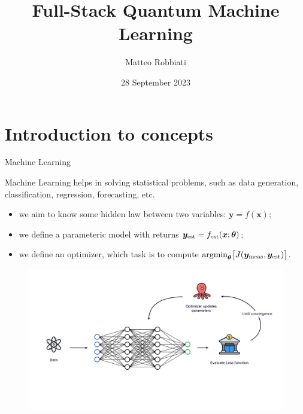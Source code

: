 \documentclass[8pt, xcolor={svgnames}, hyperref={linkcolor=black}]{beamer}
\title{Full-Stack Quantum Machine Learning}
\date{28 September 2023}
\author{Matteo Robbiati}
\begin{document}
\begin{frame}
\maketitle
\end{frame}

\section{Introduction to concepts}

\begin{frame}{Machine Learning}

Machine Learning helps in solving statistical problems, such as data generation, 
classification, regression, forecasting, etc.
\pause

\begin{itemize}
\item[\faCrosshairs] we aim to know some hidden law between two variables: $\bm{y}=f(\bm{x})$;
\pause
\item[\faBarChart] we define a parameteric model with returns $\bm{y}_{\rm est}=f_{\rm est}(\bm{x}; \bm{\theta})$;
\pause
\item[\faBinoculars] we define an optimizer, which task is to compute 
   $\text{argmin}_{\bm{\theta}}\bigl[J(\bm{y}_{\rm meas}, \bm{y}_{\rm est})\bigr]$.
\end{itemize}
\pause
\begin{figure}  
    \includegraphics[width=1\textwidth]{figures/ml_scheme.png}
\end{figure}
\end{frame}
\end{document}
